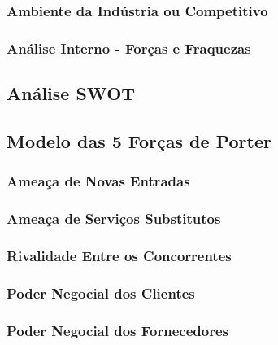 \documentclass[11pt]{article}
\begin{document}
	
	\large
	\subsubsection{Ambiente da Indústria ou Competitivo}
	
	\normalsize
	
	
	\large
	\subsubsection{Análise Interno - Forças e Fraquezas}
	
	\normalsize
	
	
	\large
	\subsection{Análise SWOT}
	
	\normalsize
	
	
	\large
	\subsection{Modelo das 5 Forças de Porter}
	
	\normalsize
	
	
	\large
	\subsubsection{Ameaça de Novas Entradas}
	
	\normalsize
	
	
	\large
	\subsubsection{Ameaça de Serviços Substitutos}
	
	\normalsize
	
	
	\large
	\subsubsection{Rivalidade Entre os Concorrentes}
	
	\normalsize
	
	
	\large
	\subsubsection{Poder Negocial dos Clientes}
	
	\normalsize
	
	
	\large
	\subsubsection{Poder Negocial dos Fornecedores}
	
\end{document}
